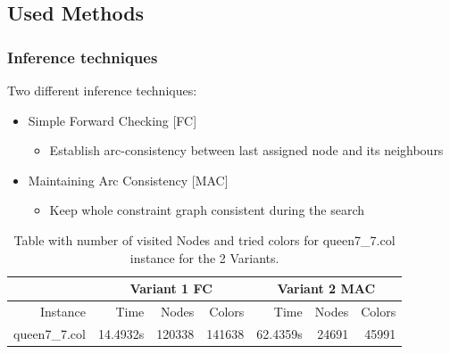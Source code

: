\documentclass{beamer}
\begin{document}
\subsection{Used Methods}
\begin{frame}
    \frametitle{Inference techniques}
	Two different inference techniques:
	\begin{itemize}
	\item{Simple Forward Checking [FC]}	
		\begin{itemize}	
		\item{Establish arc-consistency between last assigned node and its neighbours}
		\end{itemize}
	\item{Maintaining Arc Consistency [MAC]}
	\begin{itemize}	
		\item{Keep whole constraint graph consistent during the search}
		\end{itemize}
	\end{itemize}

\begin{table}
  \tiny
 \begin{center}
          \begin{tabular}{r | r | r | r | r | r | r}
            \hline
             & \multicolumn{3}{c|}{Variant 1 FC} & \multicolumn{3}{c}{Variant 2 MAC} \\
            \hline
            Instance & Time & Nodes & Colors &  Time & Nodes & Colors \\
            \hline \hline 
            queen7\_7.col & 14.4932s & 120338 & 141638 & 62.4359s & 24691 & 45991\\
            \hline
\end{tabular}
        \caption{Table with number of visited Nodes and tried colors for queen7\_7.col instance for the 2 Variants. }
        \label{visitedTable}
        \end{center}
\end{table}

  \end{frame}
\end{document}
